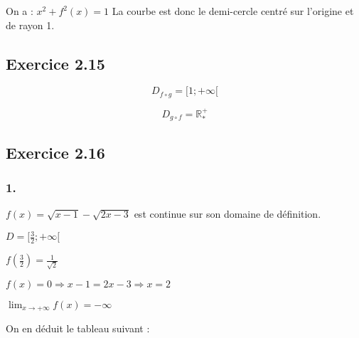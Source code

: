 \documentclass{report}
\begin{document}


On a : $x^2 + f^2(x) = 1$
La courbe est donc le demi-cercle centré sur l'origine et de rayon 1.

\subsection*{Exercice 2.15}

\begin{displaymath}
	D_{f \circ g} = [1 ; +\infty[
\end{displaymath}

\begin{displaymath}
	D_{g \circ f} = \mathbb{R}^{+}_{*}
\end{displaymath}


\subsection*{Exercice 2.16}
\subsubsection*{1.}
$f(x) = \sqrt{x-1} - \sqrt{2x-3}$ est continue sur son domaine de définition.

$D = [\frac{3}{2} ; +\infty[$

$f(\frac{3}{2}) = \frac{1}{\sqrt{2}}$

$f(x) = 0 \Rightarrow x-1 = 2x-3 \Rightarrow x = 2 $

$\lim_{x \rightarrow +\infty} f(x) = -\infty$

On en déduit le tableau suivant :

\end{document}
